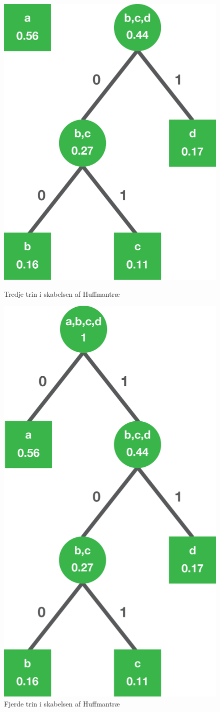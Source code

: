 \begin{figure}[!h]
\begin{minipage}{0.45\textwidth}
\centering
\includegraphics[width=0.6\linewidth]{Billeder/Huffman-tree-ex-03.png}
\caption{Tredje trin i skabelsen af Huffmantræ}
\label{fig:huffmantrae_ex3}
\end{minipage}
\hspace{0.5cm}
\begin{minipage}{0.45\textwidth}
\centering
\includegraphics[width=0.6\linewidth]{Billeder/Huffman-tree-ex-04.png}
\caption{Fjerde trin i skabelsen af Huffmantræ}
\label{fig:huffmantrae_ex4}
\end{minipage}
\end{figure}